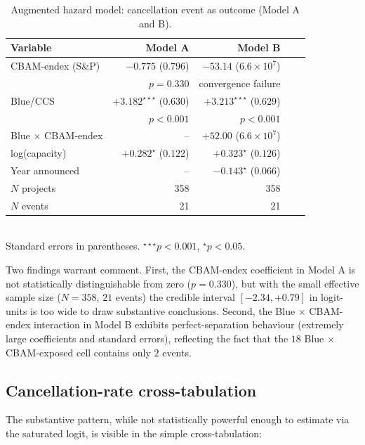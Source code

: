 \documentclass[11pt,a4paper]{article}
\begin{document}
\begin{table}[ht]
\centering
\caption{Augmented hazard model: cancellation event as outcome (Model A and B).}
\label{tab:app-augmented-hazard}
\begin{tabular}{lrrrr}
\toprule
Variable & Model A & Model B & \\
\midrule
CBAM-endex (S\&P)        & $-0.775$ ($0.796$) & $-53.14$ ($6.6 \times 10^{7}$) \\
                          & $p = 0.330$         & convergence failure \\
Blue/CCS                  & $+3.182^{\star\star\star}$ ($0.630$) & $+3.213^{\star\star\star}$ ($0.629$) \\
                          & $p < 0.001$         & $p < 0.001$ \\
Blue $\times$ CBAM-endex  & --                  & $+52.00$ ($6.6 \times 10^{7}$) \\
log(capacity)             & $+0.282^{\star}$ ($0.122$) & $+0.323^{\star}$ ($0.126$) \\
Year announced            & --                  & $-0.143^{\star}$ ($0.066$) \\
\midrule
$N$ projects              & 358 & 358 \\
$N$ events                & 21 & 21 \\
\bottomrule
\end{tabular}
\\\footnotesize{Standard errors in parentheses. $^{\star\star\star}p<0.001$, $^{\star}p<0.05$.}
\end{table}

Two findings warrant comment. First, the CBAM-endex coefficient in Model A is not statistically distinguishable from zero ($p = 0.330$), but with the small effective sample size ($N=358$, $21$ events) the credible interval $[-2.34, +0.79]$ in logit-units is too wide to draw substantive conclusions. Second, the Blue $\times$ CBAM-endex interaction in Model B exhibits perfect-separation behaviour (extremely large coefficients and standard errors), reflecting the fact that the $18$ Blue $\times$ CBAM-exposed cell contains only $2$ events.

\subsection{Cancellation-rate cross-tabulation}

The substantive pattern, while not statistically powerful enough to estimate via the saturated logit, is visible in the simple cross-tabulation:
\end{document}
